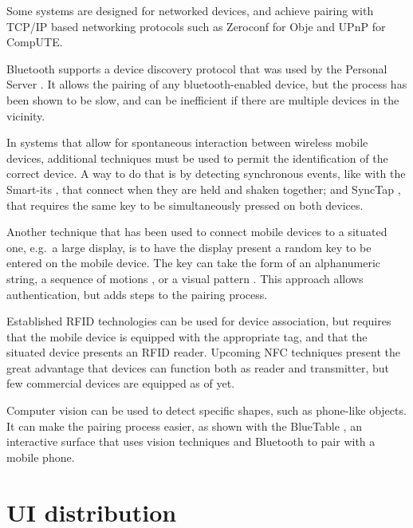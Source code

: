 Some systems are designed for networked devices, and achieve pairing with TCP/IP based networking protocols such as Zeroconf \citeyearpar{zeroconf} for Obje and UPnP \citeyearpar{upnp} for CompUTE.

Bluetooth \citeyearpar{bluetooth} supports a device discovery protocol that was used by the Personal Server \citep{Want:2002:personalserver}.
It allows the pairing of any bluetooth-enabled device, but the process has been shown to be slow, and can be inefficient if there are multiple devices in the vicinity.

In systems that allow for spontaneous interaction between wireless mobile devices, additional techniques must be used to permit the identification of the correct device.
A way to do that is by detecting synchronous events, like with the Smart-its \citep{Holmquist:2001:smartits}, that connect when they are held and shaken together; and SyncTap \citep{Rekimoto:2003:synctap}, that requires the same key to be simultaneously pressed on both devices.

Another technique that has been used to connect mobile devices to a situated one, e.g.\ a large display, is to have the display present a random key to be entered on the mobile device.
The key can take the form of an alphanumeric string, a sequence of motions \citep{Patel:2004:mobileauth}, or a visual pattern \citep{Ballagas:2005:sweeppointshoot, Scott:2005:visualauth}.
This approach allows authentication, but adds steps to the pairing process.

Established RFID technologies can be used for device association, but requires that the mobile device is equipped with the appropriate tag, and that the situated device presents an RFID reader.
Upcoming NFC techniques present the great advantage that devices can function both as reader and transmitter, but few commercial devices are equipped as of yet.

Computer vision can be used to detect specific shapes, such as phone-like objects.
It can make the pairing process easier, as shown with the BlueTable \citep{Wilson:2007:bluetable}, an interactive surface that uses vision techniques and Bluetooth to pair with a mobile phone.

\section{UI distribution}

